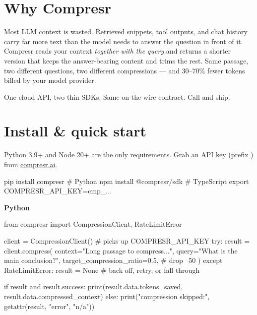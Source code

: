 \documentclass[10pt]{article}
\begin{document}

\section{Why Compresr}

Most LLM context is wasted. Retrieved snippets, tool outputs, and chat
history carry far more text than the model needs to answer the question
in front of it. Compresr reads your context \emph{together with the
query} and returns a shorter version that keeps the answer-bearing
content and trims the rest. Same passage, two different questions, two
different compressions — and 30–70\% fewer tokens billed by your model
provider.

One cloud API, two thin SDKs. Same on-the-wire contract. Call
 and ship.

\section{Install \& quick start}

Python 3.9+ and Node 20+ are the only requirements. Grab an API key
(prefix ) from
\href{https://compresr.ai}{compresr.ai}.

\begin{shcode}
pip install compresr             # Python
npm install @compresr/sdk        # TypeScript
export COMPRESR_API_KEY=cmp_...
\end{shcode}

\textbf{Python}
\begin{pycode}
from compresr import CompressionClient, RateLimitError

client = CompressionClient()             # picks up COMPRESR_API_KEY
try:
    result = client.compress(
        context="Long passage to compress...",
        query="What is the main conclusion?",
        target_compression_ratio=0.5,    # drop ~50%
    )
except RateLimitError:
    result = None                        # back off, retry, or fall through

if result and result.success:
    print(result.data.tokens_saved, result.data.compressed_context)
else:
    print("compression skipped:", getattr(result, "error", "n/a"))
\end{pycode}
\end{document}
